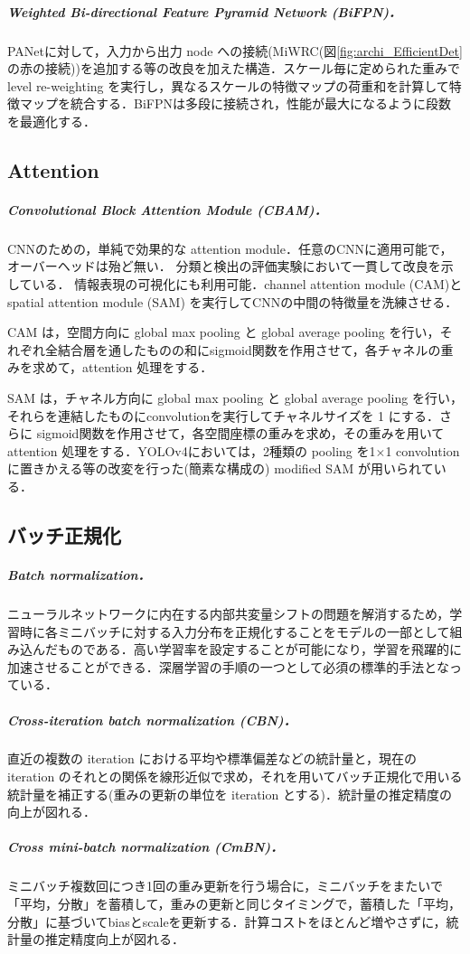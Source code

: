 \documentclass[twocolumn]{jsarticle} %
\begin{document}
\subparagraph{Weighted Bi-directional Feature Pyramid Network (BiFPN)\cite{TPL20}．} PANetに対して，入力から出力 node への接続(MiWRC(図\ref{fig:archi_EfficientDet}の赤の接続))を追加する等の改良を加えた構造．スケール毎に定められた重みで level re-weighting を実行し，異なるスケールの特徴マップの荷重和を計算して特徴マップを統合する．BiFPNは多段に接続され，性能が最大になるように段数を最適化する．

\subsection{Attention}
\subparagraph{Convolutional Block Attention Module (CBAM)\cite{WPLK18}．} CNNのための，単純で効果的な attention module．任意のCNNに適用可能で，オーバーヘッドは殆ど無い．
分類と検出の評価実験において一貫して改良を示している．
情報表現の可視化にも利用可能．channel attention module (CAM)とspatial attention module (SAM) を実行してCNNの中間の特徴量を洗練させる．

CAM は，空間方向に global max pooling と global average pooling を行い，それぞれ全結合層を通したものの和にsigmoid関数を作用させて，各チャネルの重みを求めて，attention 処理をする．

SAM は，チャネル方向に global max pooling と global average pooling を行い，それらを連結したものにconvolutionを実行してチャネルサイズを 1 にする．さらに sigmoid関数を作用させて，各空間座標の重みを求め，その重みを用いてattention 処理をする．YOLOv4においては，2種類の pooling を1$\times$1 convolution に置きかえる等の改変を行った(簡素な構成の) modified SAM が用いられている．

\subsection{バッチ正規化 \label{seq:batch}}
\subparagraph{Batch normalization\cite{IoffeSzege15}．} ニューラルネットワークに内在する内部共変量シフトの問題を解消するため，学習時に各ミニバッチに対する入力分布を正規化することをモデルの一部として組み込んだものである．高い学習率を設定することが可能になり，学習を飛躍的に加速させることができる．深層学習の手順の一つとして必須の標準的手法となっている．

\subparagraph{Cross-iteration batch normalization (CBN)\cite{YCZHL20}．}直近の複数の iteration における平均や標準偏差などの統計量と，現在の iteration のそれとの関係を線形近似で求め，それを用いてバッチ正規化で用いる統計量を補正する(重みの更新の単位を iteration とする)．統計量の推定精度の向上が図れる．

\subparagraph{Cross mini-batch normalization (CmBN)\cite{BWL20}．\label{seq:CmBN}} ミニバッチ複数回につき1回の重み更新を行う場合に，ミニバッチをまたいで「平均，分散」を蓄積して，重みの更新と同じタイミングで，蓄積した「平均，分散」に基づいてbiasとscaleを更新する．計算コストをほとんど増やさずに，統計量の推定精度向上が図れる．
\end{document}
